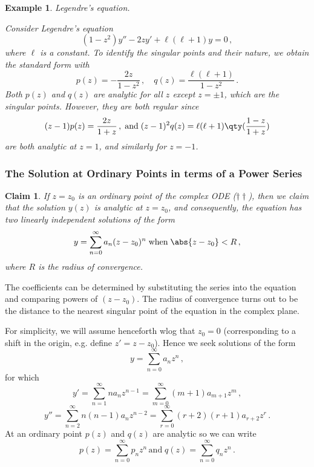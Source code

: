 \documentclass{article}
\theoremstyle{plain}\theoremheaderfont{\normalfont\itshape}\theorembodyfont{\rmfamily}\theoremseparator{.}\newtheorem*{rem}{Remark}\newtheorem*{ex}{Example}\newtheorem*{proof}{Proof}\newtheorem*{altp}{Alternative proof}
\theoremstyle{plain}\theoremheaderfont{\normalfont\bfseries}\theorembodyfont{\rmfamily}\theoremseparator{.}\newtheorem{thm}{Theorem}[section]\newtheorem{lem}[thm]{Lemma}\newtheorem{prop}[thm]{Proposition}\newtheorem*{cor}{Corollary}\newtheorem{defn}[thm]{Definition}\newtheorem{clm}[thm]{Claim}\newtheorem{clminproof}{Claim}
\theoremstyle{break}\theoremheaderfont{\normalfont\itshape}\theorembodyfont{\rmfamily}\theoremseparator{.\medskip}\newtheorem*{proofskip}{Proof}\newtheorem*{exs}{Examples}\newtheorem*{rems}{Remarks}
\theoremstyle{break}\theoremheaderfont{\normalfont\bfseries}\theorembodyfont{\rmfamily}\theoremseparator{.\medskip}\newtheorem{lemskip}[thm]{Lemma}\newtheorem{defnskip}[thm]{Definition}\newtheorem{propskip}[thm]{Proposition}\newtheorem{thmskip}[thm]{Theorem}
\numberwithin{equation}{section}
\begin{document}
	\begin{ex}
		\textit{Legendre's equation.}

		Consider \textit{Legendre's equation}
		\begin{equation}\tag{\(*\)}
			(1-z^2)y''-2zy'+\ell (\ell+1)y=0\,,
		\end{equation}
		where \(\ell\) is a constant. To identify the singular points and their nature, we obtain the standard form with
		\[p(z)=-\frac{2z}{1-z^2}\,,\quad q(z)=\frac{\ell(\ell+1)}{1-z^2}\,.\]
		Both \(p(z)\) and \(q(z)\) are analytic for all \(z\) except \(z=\pm 1\), which are the singular points. However, they are both regular since
		\[(z-1)p(z)=\frac{2z}{1+z}\,,\;\text{and}\;(z-1)^2q(z)=\ell(\ell+1)\qty(\frac{1-z}{1+z})\]
		are both analytic at \(z=1\), and similarly for \(z=-1\).
	\end{ex}
	\subsubsection{The Solution at Ordinary Points in terms of a Power Series}
	\begin{clm}
		If \(z=z_0\) is an ordinary point of the complex ODE (\(\dagger\dagger\)), then we claim that the solution \(y(z)\) is analytic at \(z=z_0\), and consequently, the equation has two linearly independent solutions of the form
		\[y=\sum_{n=0}^{\infty}a_n(z-z_0)^n\;\text{when}\;\abs{z-z_0}<R\,,\]
		where \(R\) is the radius of convergence.
	\end{clm}
	The coefficients can be determined by substituting the series into the equation and comparing powers of \((z-z_0)\). The radius of convergence turns out to be the distance to the nearest singular point of the equation in the complex plane.

	For simplicity, we will assume henceforth wlog that \(z_0=0\) (corresponding to a shift in the origin, e.g. define \(z'=z-z_0\)). Hence we seek solutions of the form
	\[y=\sum_{n=0}^{\infty}a_nz^n\,,\]
	for which
	\[y'=\sum_{n=1}^{\infty}na_nz^{n-1}=\sum_{m=0}^{\infty}(m+1)a_{m+1}z^m\,,\]
	\[y''=\sum_{n=2}^{\infty}n(n-1)a_nz^{n-2}=\sum_{r=0}^{\infty}(r+2)(r+1)a_{r+2}z^r\,.\]
	At an ordinary point \(p(z)\) and \(q(z)\) are analytic so we can write
	\[p(z)=\sum_{n=0}^{\infty}p_nz^n\,\text{and}\; q(z)=\sum_{n=0}^{\infty}q_nz^n\,.\]
\end{document}
